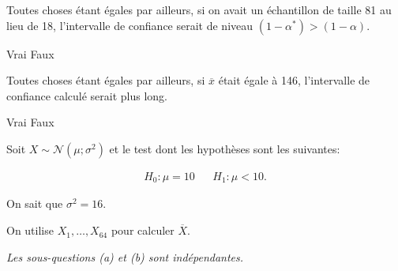 \begin{questions}
\begin{parts}
\begin{subparts}
        \subpart[1] Toutes choses étant égales par ailleurs, si on avait un échantillon de taille 81 au lieu de 18, l'intervalle de confiance serait de niveau $(1-\alpha^*)>(1-\alpha)$.
        
        \begin{oneparcheckboxes}
            \choice Vrai
            \correctchoice Faux
        \end{oneparcheckboxes}
 \vspace{0.5cm}

        \subpart[1] Toutes choses étant égales par ailleurs, si $\overline{x}$ était égale à 146, l'intervalle de confiance calculé serait plus long.
        
        \begin{oneparcheckboxes}
            \choice Vrai
            \correctchoice Faux
        \end{oneparcheckboxes}       
    \end{subparts}
\end{parts}




\pageblanche

\question 
Soit $X\sim\mathcal{N}(\mu;\sigma^2)$ et le test dont les hypothèses sont les suivantes:


\begin{align*}
    H_0 : \mu = 10  & &    H_1 : \mu <10.
\end{align*}

On sait que  $\sigma^2=16$.

On utilise $X_1,\hdots,X_{64}$ pour calculer $\overline{X}$. 

\textit{Les sous-questions (a) et (b) sont indépendantes.}
\end{questions}
